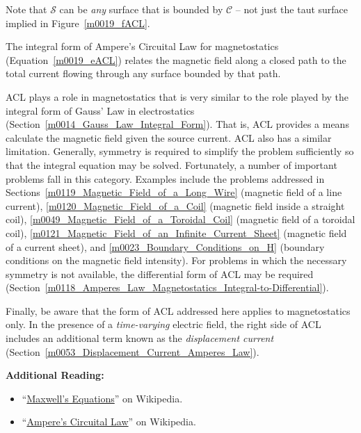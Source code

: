 Note that ${\mathcal S}$ can be \emph{any} surface that is bounded by ${\mathcal C}$ -- not just the taut surface implied in Figure~\ref{m0019_fACL}.

\begin{mdframed}[backgroundcolor=yellow!20,nobreak=true] 
The integral form of Ampere's Circuital Law for magnetostatics (Equation~\ref{m0019_eACL}) relates the magnetic field along a closed path to the total current flowing through any surface bounded by that path.
\end{mdframed}

ACL plays a role in magnetostatics that is very similar to the role played by the integral form of Gauss' Law in electrostatics (Section~\ref{m0014_Gauss_Law_Integral_Form}). 
That is, ACL provides a means calculate the magnetic field given the source current.
ACL also has a similar limitation.  Generally, symmetry is required to simplify the problem sufficiently so that the integral equation may be solved.
Fortunately, a number of important problems fall in this category.
Examples include the problems addressed in
Sections~\ref{m0119_Magnetic_Field_of_a_Long_Wire} (magnetic field of a line current), 
\ref{m0120_Magnetic_Field_of_a_Coil} (magnetic field inside a straight coil), 
\ref{m0049_Magnetic_Field_of_a_Toroidal_Coil} (magnetic field of a toroidal coil), 
\ref{m0121_Magnetic_Field_of_an_Infinite_Current_Sheet} (magnetic field of a current sheet), and 
\ref{m0023_Boundary_Conditions_on_H} (boundary conditions on the magnetic field intensity).
For problems in which the necessary symmetry is not available, the differential form of ACL may be required (Section~\ref{m0118_Amperes_Law_Magnetostatics_Integral-to-Differential}).

Finally, be aware that the form of ACL addressed here applies to magnetostatics only.  
In the presence of a \emph{time-varying} electric field, the right side of ACL includes an additional term known as the \emph{displacement current}
(Section~\ref{m0053_Displacement_Current_Amperes_Law}).


{\bf Additional Reading:}
\begin{itemize}
\item ``\href{https://en.wikipedia.org/wiki/Maxwell's_equations}{Maxwell's Equations}'' on Wikipedia.
\item ``\href{https://en.wikipedia.org/wiki/Ampere's_circuital_law}{Ampere's Circuital Law}'' on Wikipedia.
\end{itemize}

